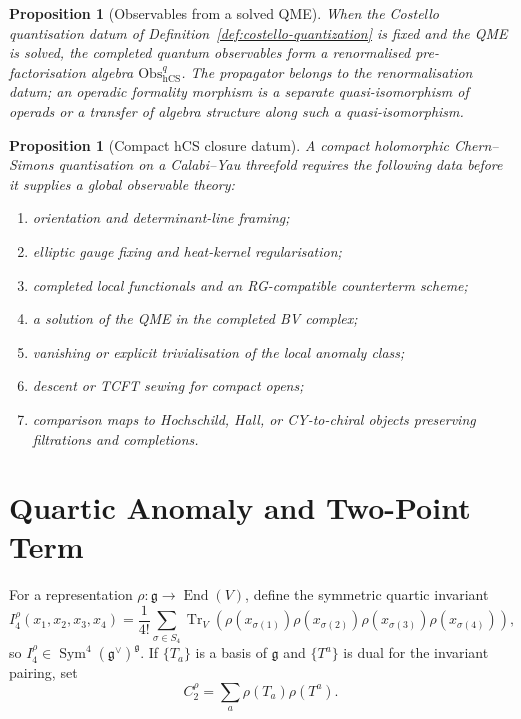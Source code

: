 \documentclass[11pt]{amsart}
\newtheorem{proposition}[theorem]{Proposition}
\theoremstyle{definition}
\theoremstyle{remark}
\providecommand{\hCS}{\mathrm{hCS}}
\providecommand{\Obs}{\mathrm{Obs}}
\providecommand{\gfrak}{\mathfrak{g}}
\begin{document}
\begin{proposition}[Observables from a solved QME]
\label{prop:propagator-observables}
When the Costello quantisation datum of
Definition~\ref{def:costello-quantization} is fixed and the QME is
solved, the completed quantum observables form a renormalised
pre-factorisation algebra $\Obs^q_{\hCS}$. The propagator belongs to the
renormalisation datum; an operadic formality morphism is a separate
quasi-isomorphism of operads or a transfer of algebra structure along
such a quasi-isomorphism.
\end{proposition}

\begin{proposition}[Compact hCS closure datum]
\label{prop:compact-hcs-closure}
A compact holomorphic Chern--Simons quantisation on a Calabi--Yau
threefold requires the following data before it supplies a global
observable theory:
\begin{enumerate}
\item orientation and determinant-line framing;
\item elliptic gauge fixing and heat-kernel regularisation;
\item completed local functionals and an RG-compatible counterterm
scheme;
\item a solution of the QME in the completed BV complex;
\item vanishing or explicit trivialisation of the local anomaly class;
\item descent or TCFT sewing for compact opens;
\item comparison maps to Hochschild, Hall, or CY-to-chiral objects
preserving filtrations and completions.
\end{enumerate}
\end{proposition}

\section{Quartic Anomaly and Two-Point Term}
\label{sec:quartic-anomaly-two-point}

For a representation $\rho:\gfrak\to\operatorname{End}(V)$, define the
symmetric quartic invariant
\[
I_4^\rho(x_1,x_2,x_3,x_4)
=
\frac1{4!}\sum_{\sigma\in S_4}
\operatorname{Tr}_V\!\left(
\rho(x_{\sigma(1)})\rho(x_{\sigma(2)})
\rho(x_{\sigma(3)})\rho(x_{\sigma(4)})
\right),
\]
so $I_4^\rho\in\operatorname{Sym}^4(\gfrak^\vee)^\gfrak$. If
$\{T_a\}$ is a basis of $\gfrak$ and $\{T^a\}$ is dual for the invariant
pairing, set
\[
C_2^\rho=\sum_a\rho(T_a)\rho(T^a).
\]
\end{document}
